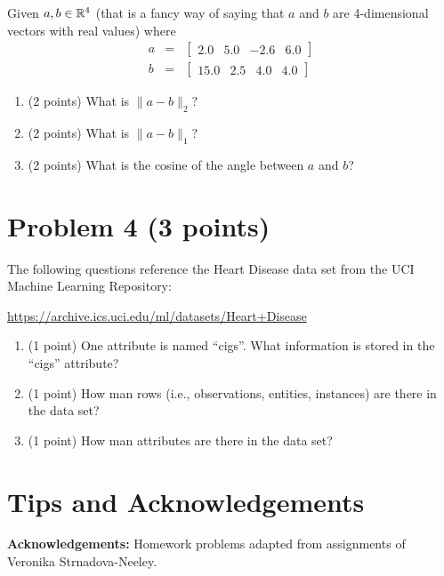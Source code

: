 \documentclass[11pt]{article}
\begin{document}
Given $a, b \in \mathbb{R}^4$ (that is a fancy way of saying that $a$ and $b$ are
4-dimensional vectors with real values) where
\begin{eqnarray*}
    a &=& \begin{bmatrix} 2.0  & 5.0 & -2.6 & 6.0 \end{bmatrix} \\
    b &=& \begin{bmatrix} 15.0 & 2.5 &  4.0 & 4.0 \end{bmatrix}
\end{eqnarray*}

\begin{enumerate}
    \item (2 points) What is $\|a-b\|_2$?
    \item (2 points) What is $\|a-b\|_1$?
    \item (2 points) What is the cosine of the angle between $a$ and $b$?
\end{enumerate}

\section*{Problem 4 (3 points)}

The following questions reference the Heart Disease data set from the UCI
Machine Learning Repository:

\url{https://archive.ics.uci.edu/ml/datasets/Heart+Disease}

\begin{enumerate}
    \item (1 point) One attribute is named ``cigs''.  What information is stored
    in the ``cigs'' attribute?
    \item (1 point) How man rows (i.e., observations, entities, instances) are
    there in the data set?
    \item (1 point) How man attributes are there in the data set?
\end{enumerate}

\section*{Tips and Acknowledgements}

{\bf Acknowledgements:} Homework problems adapted from assignments of
Veronika Strnadova-Neeley.
\end{document}
